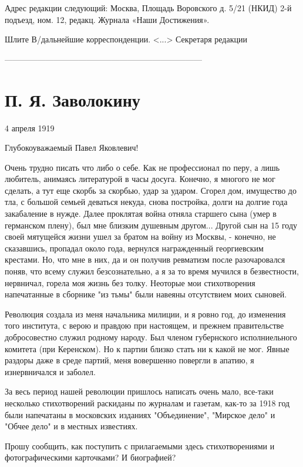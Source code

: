 \documentclass[]{memoir}
\begin{document}
Адрес редакции следующий: Москва, Площадь Воровского д. 5/21 (НКИД) 2-й подъезд, ном. 12, редакц. Журнала «Наши Достижения».

Шлите В/дальнейшие корреспонденции.
<...> Секретаря редакции 

------------------------------------------------------------------------
\section{П. Я. Заволокину}
4 апреля 1919



Глубокоуважаемый Павел Яковлевич!

Очень трудно писать что либо о себе. Как не профессионал по перу, а лишь любитель, анимаясь литературой в часы досуга. Конечно, я многого не мог сделать, а тут еще скорбь за скорбью, удар за ударом. Сгорел дом, имущество до тла, с большой семьей деваться некуда, снова постройка, долги на долгие года закабаление в нужде. Далее проклятая война отняла старшего сына (умер в германском плену), был мне близким душевным другом... Другой сын на 15 году своей мятущейся жизни ушел за братом на войну из Москвы, - конечно, не сказавшись, пропадал около года, вернулся награжденный георгиевским крестами. Но, что мне в них, да и он получив ревматизм после разочаровался поняв, что всему служил безсознательно, а я за то время мучился в безвестности, нервничал, горела моя жизнь без толку. Неоторые мои стихотворения напечатанные в сборнике "из тьмы" были навеяны отсутствием моих сыновей.

Революция создала из меня начальника милиции, и я ровно год, до изменения того института, с верою и правдою при настоящем, и прежнем правительстве добросовестно служил родному народу. Был членом губернского исполниельного комитета (при Керенском). Но к партии близко стать ни к какой не мог. Явные раздоры даже в среде партий, меня вовершенно повергли в апатию, я изнервничался и заболел.

За весь период нашей революции пришлось написать очень мало, все-таки несколько стихотворений раскиданы по журналам и газетам, как-то за 1918 год были напечатаны в московских изданиях "Объединение", "Мирское дело" и "Обчее дело" и в местных известиях.

Прошу сообщить, как поступить с прилагаемыми здесь стихотворениями и фотографическими карточками? И биографией?
\end{document}
